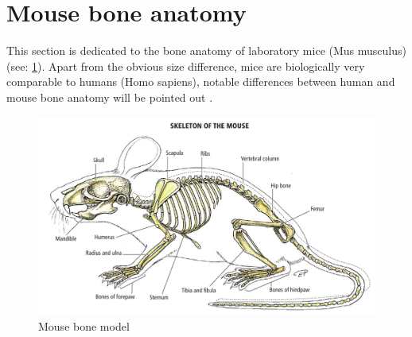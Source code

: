 \section{Mouse bone anatomy}\label{s:b-mouse-anatomy}
This section is dedicated to the bone anatomy of laboratory mice (Mus musculus) (see: \cref{fig:mouseFull}).
Apart from the obvious size difference, mice are biologically very comparable to humans (Homo sapiens),
notable differences between human and mouse bone anatomy will be pointed out \cite{ruberteBridgingMouseHuman2023}.
\begin{figure}[h]
	\centerline{
		\includegraphics[scale=0.5]{images/mouseFull.png}}
	\caption{Mouse bone model \cite{ruberteBridgingMouseHuman2023}}\label{fig:mouseFull}
\end{figure}




